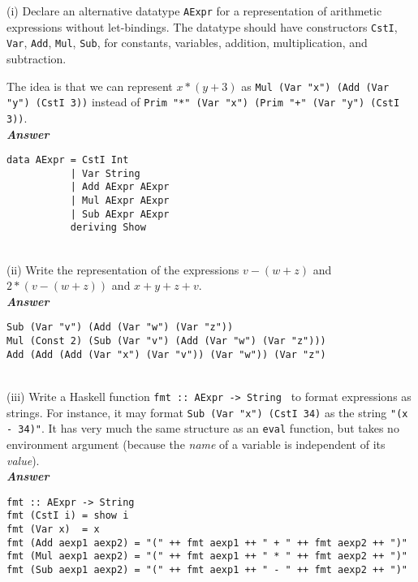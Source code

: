 \documentclass[a4paper]{article}
\begin{document}
\begin{exercise}\label{exer-aexpr-datatype}
  (i) Declare an alternative datatype \texttt{AExpr} for a
representation of arithmetic expressions without let-bindings.  The
datatype should have constructors \texttt{CstI}, \texttt{Var},
\texttt{Add}, \texttt{Mul}, \texttt{Sub}, for constants, variables,
addition, multiplication, and subtraction.
  
The idea is that we can represent $x*(y+3)$ as \texttt{Mul (Var "x")
  (Add (Var "y") (CstI 3))} instead of \texttt{Prim "*" (Var "x")
  (Prim "+" (Var "y") (CstI 3))}.\\
  
\noindent
\textbf{\emph{Answer}}
{\codesetup\begin{verbatim}
data AExpr = CstI Int
           | Var String
           | Add AExpr AExpr 
           | Mul AExpr AExpr
           | Sub AExpr AExpr
           deriving Show
\end{verbatim}}\\

\noindent
(ii) Write the representation of the expressions $v-(w+z)$ and
$2*(v-(w+z))$ and $x+y+z+v$.\\
  
\noindent
\textbf{\emph{Answer}}
{\codesetup\begin{verbatim}
Sub (Var "v") (Add (Var "w") (Var "z"))
Mul (Const 2) (Sub (Var "v") (Add (Var "w") (Var "z")))
Add (Add (Add (Var "x") (Var "v")) (Var "w")) (Var "z")
\end{verbatim}}\\

\noindent
(iii) Write a Haskell function \texttt{fmt ::\ AExpr -> String } to format
expressions as strings.  For instance, it may format \texttt{Sub (Var
  "x") (CstI 34)} as the string \texttt{"(x - 34)"}.  It has very much
the same structure as an \texttt{eval} function, but takes no
environment argument (because the \emph{name} of a variable is
independent of its \emph{value}).\\
  
\noindent
\textbf{\emph{Answer}}
{\codesetup\begin{verbatim}
fmt :: AExpr -> String
fmt (CstI i) = show i
fmt (Var x)  = x
fmt (Add aexp1 aexp2) = "(" ++ fmt aexp1 ++ " + " ++ fmt aexp2 ++ ")"
fmt (Mul aexp1 aexp2) = "(" ++ fmt aexp1 ++ " * " ++ fmt aexp2 ++ ")"
fmt (Sub aexp1 aexp2) = "(" ++ fmt aexp1 ++ " - " ++ fmt aexp2 ++ ")"
\end{verbatim}}\\


\end{exercise}
\end{document}
